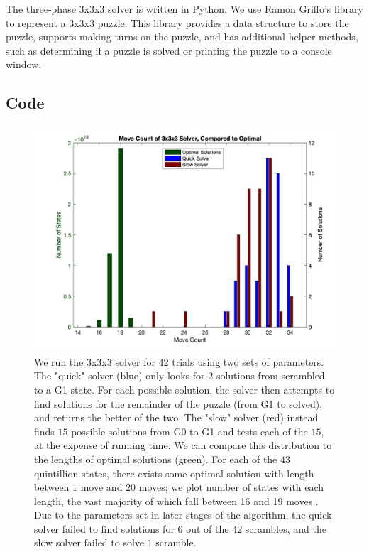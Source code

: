 \documentclass{article}
\begin{document}
The three-phase 3x3x3 solver is written in Python. We use Ramon Griffo's library \cite{git-lib} to represent a 3x3x3 puzzle. This library provides a data structure to store the puzzle, supports making turns on the puzzle, and has additional helper methods, such as determining if a puzzle is solved or printing the puzzle to a console window.

\subsection{Code}

\begin{figure}
	\centering
    \includegraphics[width=5.5in]{movecount.jpg}
	\caption{We run the 3x3x3 solver for $42$ trials using two sets of parameters. The "quick" solver (blue) only looks for $2$ solutions from scrambled to a G1 state. For each possible solution, the solver then attempts to find solutions for the remainder of the puzzle (from G1 to solved), and returns the better of the two. The "slow" solver (red) instead finds $15$ possible solutions from G0 to G1 and tests each of the $15$, at the expense of running time. We can compare this distribution to the lengths of optimal solutions (green). For each of the $43$ quintillion states, there exists some optimal solution with length between $1$ move and $20$ moves; we plot number of states with each length, the vast majority of which fall between 16 and 19 moves \cite{god}. Due to the parameters set in later stages of the algorithm, the quick solver failed to find solutions for $6$ out of the $42$ scrambles, and the slow solver failed to solve $1$ scramble.}
	\label{fig:movecount}
\end{figure}
\end{document}
